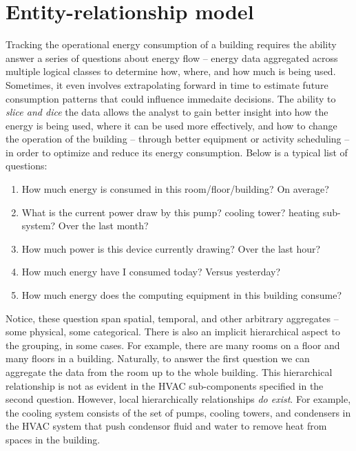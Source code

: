 \section{Entity-relationship model}

Tracking the operational energy consumption of a building requires the ability answer a series of questions
about energy flow -- energy data aggregated across multiple logical classes to determine how, where, and how 
much is being used.  Sometimes, it even involves extrapolating forward in time to estimate 
future consumption patterns that could influence immedaite decisions.  The ability to \emph{slice and dice} 
the data allows the analyst
to gain better insight into how the energy is being used, where it can be used more effectively, and how
to change the operation of the building -- through better equipment or activity scheduling -- 
in order to optimize and reduce its energy consumption.
Below is a typical list of questions:

\begin{enumerate}
\item How much energy is consumed in this room/floor/building?  On average?
\item What is the current power draw by this pump? cooling tower? heating sub-system?  Over
		the last month?
\item How much power is this device currently drawing? Over the last hour?
\item How much energy have I consumed today?  Versus yesterday?
\item How much energy does the computing equipment in this building consume?
\end{enumerate}
\vspace{0.08in}

Notice, these question span spatial, temporal, and other arbitrary aggregates -- some physical, some
categorical.  There is also
an implicit hierarchical aspect to the grouping, in some cases.  For example, there are many
rooms on a floor and many floors in a building.  Naturally, to answer the first question we can
aggregate the data from the room up to the whole building.  This hierarchical relationship
is not as evident in the HVAC sub-components specified in the second question.  However,
local hierarchically relationships \emph{do exist}.  For example, the cooling system consists
of the set of pumps, cooling towers, and condensers in the HVAC system that push condensor
fluid and water to remove heat from spaces in the building.

